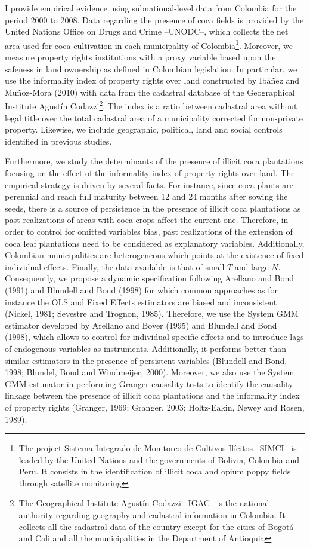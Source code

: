 \documentclass[12pt,a4paper,english]{article}%
\begin{document}
I provide empirical evidence using subnational-level data from Colombia for the period 2000 to 2008. Data regarding the presence of coca fields is provided by the United Nations Office on Drugs and Crime --UNODC--, which collects the net area used for coca cultivation in each municipality of Colombia\footnote{The project Sistema Integrado de Monitoreo de Cultivos Il\'{i}citos --SIMCI-- is leaded by the United Nations and the governments of Bolivia, Colombia and Peru. It consists in the identification of illicit coca and opium poppy fields through satellite monitoring}. Moreover, we measure property rights institutions with a proxy variable based upon the safeness in land ownership as defined in Colombian legislation. In particular, we use the informality index of property rights over land constructed by Ib\'{a}\~{n}ez and Mu\~{n}oz-Mora (2010) with data from the cadastral database of the Geographical Institute Agust\'{i}n Codazzi\footnote{The Geographical Institute Agust\'{i}n Codazzi --IGAC-- is the national authority regarding geography and cadastral information in Colombia. It collects all the cadastral data of the country except for the cities of Bogot\'{a} and Cali and all the municipalities in the Department of Antioquia}. The index is a ratio between cadastral area without legal title over the total cadastral area of a municipality corrected for non-private property. Likewise, we include geographic, political, land and social controls identified in previous studies.

Furthermore, we study the determinants of the presence of illicit coca plantations focusing on the effect of the informality index of property rights over land. The empirical strategy is driven by several facts. For instance, since coca plants are perennial and reach full maturity between 12 and 24 months after sowing the seeds, there is a source of persistence in the presence of illicit coca plantations as past realizations of areas with coca crops affect the current one. Therefore, in order to control for omitted variables bias, past realizations of the extension of coca leaf plantations need to be considered as explanatory variables. Additionally, Colombian municipalities are heterogeneous which points at the existence of fixed individual effects. Finally, the data available is that of small $T$ and large $N$. Consequently, we propose a dynamic specification following Arellano and Bond (1991) and Blundell and Bond (1998) for which common approaches as for instance the OLS and Fixed Effects estimators are biased and inconsistent (Nickel, 1981; Sevestre and Trognon, 1985). Therefore, we use the System GMM estimator developed by Arellano and Bover (1995) and Blundell and Bond (1998), which allows to control for individual specific effects and to introduce lags of endogenous variables as instruments. Additionally, it performs better than similar estimators in the presence of persistent variables (Blundell and Bond, 1998; Blundel, Bond and Windmeijer, 2000). Moreover, we also use the System GMM estimator in performing Granger causality tests to identify the causality linkage between the presence of illicit coca plantations and the informality index of property rights (Granger, 1969; Granger, 2003; Holtz-Eakin, Newey and Rosen, 1989).
\end{document}
